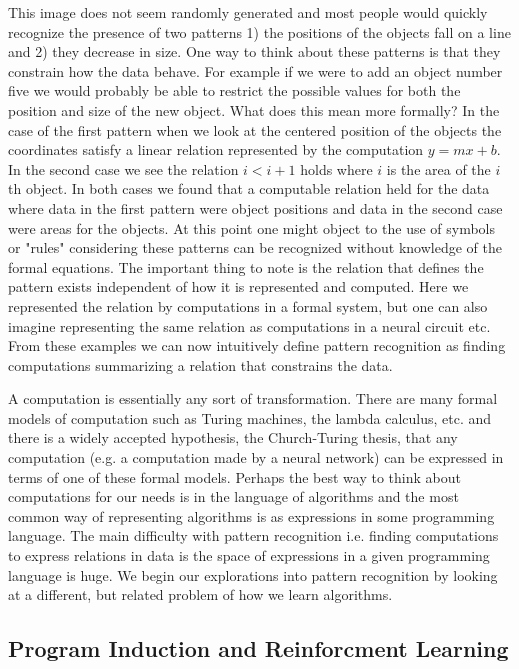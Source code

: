 \documentclass[a4paper,12pt]{article}
\begin{document}
This image does not seem randomly generated and most people would
quickly recognize the presence of two patterns 1) the positions of the objects fall on a line and 2) they decrease in
size.  One way to think about these patterns is that they constrain how the data behave.  For example if we were to add an object number five we would probably be able to restrict the possible values for both the position and size of the new object.  What does this mean more formally?  In the case of the first
pattern when we look at the centered position of the objects the
coordinates satisfy a linear relation represented by the computation
$y=mx+b$.  In the second case we see the relation $i<i+1$ holds where $i$ is
the area of the $i$th object.  In both cases we found that a computable
relation held for the data where data in the first pattern were object
positions and data in the second case were areas for the objects.  At
this point one might object to the use of symbols or "rules"
considering these patterns can be recognized without knowledge of the
formal equations.  The important thing to note is the relation that
defines the pattern exists independent of how it is represented and
computed.  Here we represented the relation by computations in a
formal system, but one can also imagine representing the same relation
as computations in a neural circuit etc.  From these examples we can
now intuitively define pattern recognition as finding computations summarizing a relation that constrains the data. 

A computation is essentially any sort of transformation.  There are many formal models of computation such as Turing
machines, the lambda calculus, etc. and there is a widely accepted
hypothesis, the Church-Turing thesis, that any computation (e.g. a computation made by a neural
network) can be expressed in terms of one of these formal models.  Perhaps the best way to think
about computations for our needs is in the language of algorithms and the most common way of representing algorithms is as expressions in some programming
language.  The main difficulty with pattern recognition i.e. finding computations to express relations in data is the space of expressions in a given programming language is huge.  We begin our explorations into pattern recognition by looking at a different, but related problem of how we learn algorithms.

\subsection{Program Induction and Reinforcment Learning}
\end{document}
